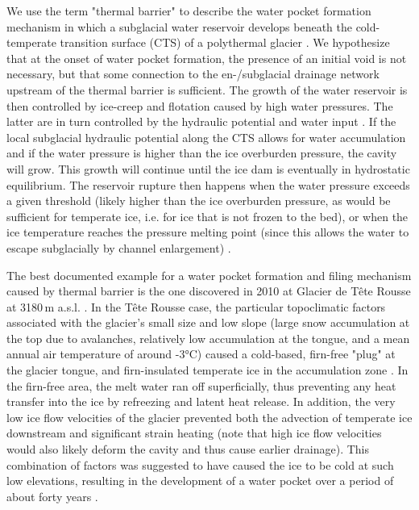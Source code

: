 We use the term "thermal barrier" to describe the water pocket formation mechanism in which a subglacial water reservoir develops beneath the cold-temperate transition surface (CTS) of a polythermal glacier \citep[Fig.~\ref{fig:WPthermo}; see][for a review on the hydrology of polythermal glaciers]{Irvine&al2011}. We hypothesize that at the onset of water pocket formation, the presence of an initial void is not necessary, but that some connection to the en-/subglacial drainage network upstream of the thermal barrier is sufficient. The growth of the water reservoir is then controlled by ice-creep and flotation caused by high water pressures. The latter are in turn controlled by the hydraulic potential and water input \citep{Vincent&al2015}. If the local subglacial hydraulic potential along the CTS allows for water accumulation and if the water pressure is higher than the ice overburden pressure, the cavity will grow. This growth will continue until the ice dam is eventually in hydrostatic equilibrium. The reservoir rupture then happens when the water pressure exceeds a given threshold (likely higher than the ice overburden pressure, as would be sufficient for temperate ice, i.e. for ice that is not frozen to the bed), or when the ice temperature reaches the pressure melting point (since this allows the water to escape subglacially by channel enlargement) \citep[e.g.][]{Vincent&al2010b}.  

The best documented example for a water pocket formation and filing mechanism caused by thermal barrier is the one discovered in 2010 at Glacier de Tête Rousse at 3180\,m a.s.l. \citep{Vincent&al2012,Gilbert&al2012,Vincent&al2015}. In the Tête Rousse case, the particular topoclimatic factors associated with the glacier's small size and low slope (large snow accumulation at the top due to avalanches, relatively low accumulation at the tongue, and a mean annual air temperature of around -3°C) caused a cold-based, firn-free "plug" at the glacier tongue, and firn-insulated temperate ice in the accumulation zone \citep{Gilbert&al2012}. In the firn-free area, the melt water ran off superficially, thus preventing any heat transfer into the ice by refreezing and latent heat release. In addition, the very low ice flow velocities of the glacier prevented both the advection of temperate ice downstream and significant strain heating (note that high ice flow velocities would also likely deform the cavity and thus cause earlier drainage). This combination of factors was suggested to have caused the ice to be cold at such low elevations, resulting in the development of a water pocket over a period of about forty years \citep{Gilbert&al2012}. 

